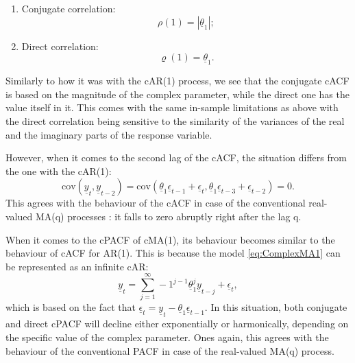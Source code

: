 \documentclass[
]{book}
\begin{document}
\begin{enumerate}
\def\labelenumi{\arabic{enumi}.}
\item
  Conjugate correlation:
  \begin{equation}
   \rho(1) = | \underline{\theta}_1 |;
   \label{eq:ComplexMA1ConjCor}
  \end{equation}
\item
  Direct correlation:
  \begin{equation}
   \varrho(1) =  \underline{\theta}_1.
   \label{eq:ComplexMA1DirCor}
  \end{equation}
\end{enumerate}

Similarly to how it was with the cAR(1) process, we see that the conjugate cACF is based on the magnitude of the complex parameter, while the direct one has the value itself in it. This comes with the same in-sample limitations as above with the direct correlation being sensitive to the similarity of the variances of the real and the imaginary parts of the response variable.

However, when it comes to the second lag of the cACF, the situation differs from the one with the cAR(1):
\begin{equation}
    \mathrm{cov} \left(\underline{y}_t, \underline{y}_{t-2} \right) = \mathrm{cov}\left( \underline{\theta}_1 \underline{\epsilon}_{t-1} + \underline{\epsilon}_t, \underline{\theta}_1 \underline{\epsilon}_{t-3} + \underline{\epsilon}_{t-2} \right) = 0 .
    \label{eq:ComplexMA1Lag2}
\end{equation}
This agrees with the behaviour of the cACF in case of the conventional real-valued MA(q) processes \citep{Box1976}: it falls to zero abruptly right after the lag q.

When it comes to the cPACF of cMA(1), its behaviour becomes similar to the behaviour of cACF for AR(1). This is because the model \eqref{eq:ComplexMA1} can be represented as an infinite cAR:
\begin{equation}
    \underline{y}_t = \sum_{j=1}^\infty -1^{j-1} \underline{\theta}_1^j \underline{y}_{t-j} + \underline{\epsilon}_t ,
    \label{eq:ComplexMA1Infinite}
\end{equation}
which is based on the fact that \(\underline{\epsilon}_t = \underline{y}_t - \underline{\theta}_1 \underline{\epsilon}_{t-1}\). In this situation, both conjugate and direct cPACF will decline either exponentially or harmonically, depending on the specific value of the complex parameter. Ones again, this agrees with the behaviour of the conventional PACF in case of the real-valued MA(q) process.
\end{document}
